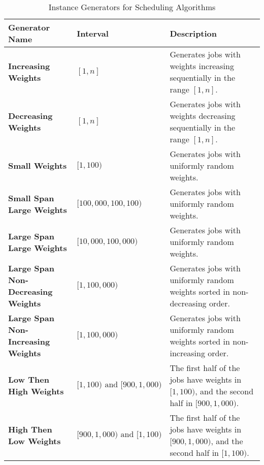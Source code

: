 \begin{table}[h]
    \label{tab:instance_generators}
    \begin{tabularx}{\textwidth}{@{}XXp{7cm}@{}}
        \toprule
        \textbf{Generator Name}                    & \textbf{Interval}                      & \textbf{Description}                                                                            \\
        \midrule
        \textbf{Increasing Weights}                & $[1, n]$                               & Generates jobs with weights increasing sequentially in the range $[1, n]$.                      \\
        \textbf{Decreasing Weights}                & $[1, n]$                               & Generates jobs with weights decreasing sequentially in the range $[1, n]$.                      \\
        \midrule
        \textbf{Small Weights}                     & $[1, 100)$                             & Generates jobs with uniformly random weights.                                                   \\
        \textbf{Small Span Large Weights}          & $[100{,}000, 100{,}100)$               & Generates jobs with uniformly random weights.                                                   \\
        \textbf{Large Span Large Weights}          & $[10{,}000, 100{,}000)$                & Generates jobs with uniformly random weights.                                                   \\
        \textbf{Large Span Non-Decreasing Weights} & $[1, 100{,}000)$                       & Generates jobs with uniformly random weights sorted in non-decreasing order.                    \\
        \textbf{Large Span Non-Increasing Weights} & $[1, 100{,}000)$                       & Generates jobs with uniformly random weights sorted in non-increasing order.                    \\
        \textbf{Low Then High Weights}             & $[1, 100) \text{ and } [900, 1{,}000)$ & The first half of the jobs have weights in $[1, 100)$, and the second half in $[900, 1{,}000)$. \\
        \textbf{High Then Low Weights}             & $[900, 1{,}000) \text{ and } [1, 100)$ & The first half of the jobs have weights in $[900, 1{,}000)$, and the second half in $[1, 100)$. \\
        \bottomrule
    \end{tabularx}
    \caption{Instance Generators for Scheduling Algorithms}
\end{table}

